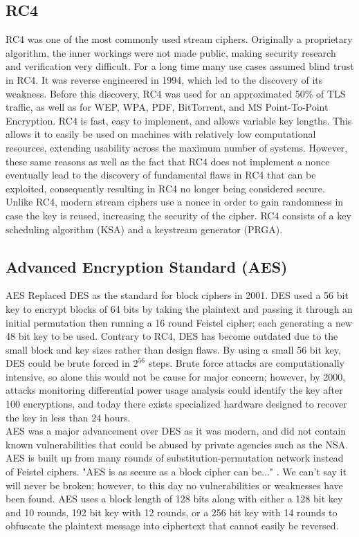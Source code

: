 \documentclass[10pt, titlepage]{article}
\begin{document}
\subsection{RC4}
RC4 was one of the most commonly used stream ciphers. Originally a proprietary algorithm, the inner workings were not made public, making security research and verification very difficult. For a long time many use cases assumed blind trust in RC4. It was reverse engineered in 1994, which led to the discovery of its weakness. Before this discovery, RC4 was used for an approximated 50\% of TLS traffic, as well as for WEP, WPA, PDF, BitTorrent, and MS Point-To-Point Encryption. RC4 is fast, easy to implement, and allows variable key lengths. This allows it to easily be used on machines with relatively low computational resources, extending usability across the maximum number of systems. However, these same reasons as well as the fact that RC4 does not implement a nonce eventually lead to the discovery of fundamental flaws in RC4 that can be exploited, consequently resulting in RC4 no longer being considered secure. Unlike RC4, modern stream ciphers use a nonce in order to gain randomness in case the key is reused, increasing the security of the cipher.  RC4 consists of a key scheduling algorithm (KSA) and a keystream generator (PRGA). \\

\subsection{Advanced Encryption Standard (AES)}
AES Replaced DES as the standard for block ciphers in 2001. DES used a 56 bit key to encrypt blocks of 64 bits by taking the plaintext and passing it through an initial permutation then running a 16 round Feistel cipher; each generating a new 48 bit key to be used. Contrary to RC4, DES has become outdated due to the small block and key sizes rather than design flaws. By using a small 56 bit key, DES could be brute forced in $2^56$ steps. Brute force attacks are computationally intensive, so alone this would not be cause for major concern; however, by 2000, attacks monitoring differential power usage analysis could identify the key after 100 encryptions, and today there exists specialized hardware designed to recover the key in less than 24 hours. \\

AES was a major advancement over DES as it was modern, and did not contain known vulnerabilities that could be abused by private agencies such as the NSA. AES is built up from many rounds of substitution-permutation network instead of Feistel ciphers. "AES is as secure as a block cipher can be..." \cite{appliedCrypto}. We can't say it will never be broken; however, to this day no vulnerabilities or weaknesses have been found. AES uses a block length of 128 bits along with either a 128 bit key and 10 rounds, 192 bit key with 12 rounds, or a 256 bit key with 14 rounds to obfuscate the plaintext message into ciphertext that cannot easily be reversed. \\
\end{document}
